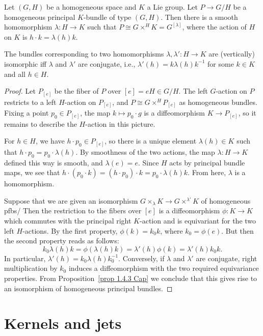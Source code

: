 \begin{prop}
    Let $(G,H)$ be a homogeneous space and $K$ a Lie group. Let $P\to G\slash H$ be a homogeneous principal $K$-bundle of type $(G,H)$. Then there is a smooth homomorphism $\lambda:H\to K$ such that $P\cong G\times^H K=G^{[\lambda]}$, where the action of $H$ on $K$ is $h\cdot k=\lambda(h)k$.

    The bundles corresponding to two homomorphisms $\lambda,\lambda':H\to K$ are (vertically) isomorphic  iff $\lambda$ and $\lambda'$ are conjugate, i.e., $\lambda'(h)=k\lambda(h)k^{-1}$ for some $k\in K$ and all $h\in H$.
\end{prop}
\begin{proof}
    Let $P_{[e]}$ be the fiber of $P$ over $[e]=eH\in G\slash H$. The left $G$-action on $P$ restricts to a left $H$-action on $P_{[e]}$, and $P\cong G\times^H P_{[e]}$ as homogeneous bundles. Fixing a point $p_0\in P_{[e]}$, the map $k\mapsto p_0\cdot g$ is a diffeomorphism $K\to P_{[e]}$, so it remains to describe the $H$-action in this picture.

    For $h\in H$, we have $h\cdot p_0\in P_{[e]}$, so there is a unique element $\lambda(h)\in K$ such that $h\cdot p_0=p_0\cdot \lambda(h)$. By smoothness of the two actions, the map $\lambda:H\to K$ defined this way is smooth, and $\lambda(e)=e$. Since $H$ acts by principal bundle maps, we see that $h\cdot (p_0\cdot k)=(h\cdot p_0)\cdot k=p_0\cdot \lambda(h)k$. From here, $\lambda$ is a homomorphism.

    Suppose that we are given an isomorphism $G\times_\lambda K\to G\times^{\lambda'}K$ of homogeneous \glspl{pfb}/ Then the restriction to the fibers over $[e]$ is a diffeomorphism $\phi:K\to K$ which commutes with the principal right $K$-action and is equivariant for the two left $H$-actions. By the first property, $\phi(k)=k_0k$, where $k_0=\phi(e)$. But then the second property reads as follows:
    \[k_0\lambda(h)k=\phi(\lambda(h)k)=\lambda'(h)\phi(k)=\lambda'(h)k_0k.\]
    In particular, $\lambda'(h)=k_0\lambda(h)k_0^{-1}$. Conversely, if $\lambda$ and $\lambda'$ are conjugate, right multiplication by $k_0$ induces a diffeomorphism with the two required equivariance properties. From Proposition~\ref{prop 1.4.3 Cap} we conclude that this gives rise to an isomorphism of homogeneous principal bundles. 
\end{proof}





\section{Kernels and jets}


